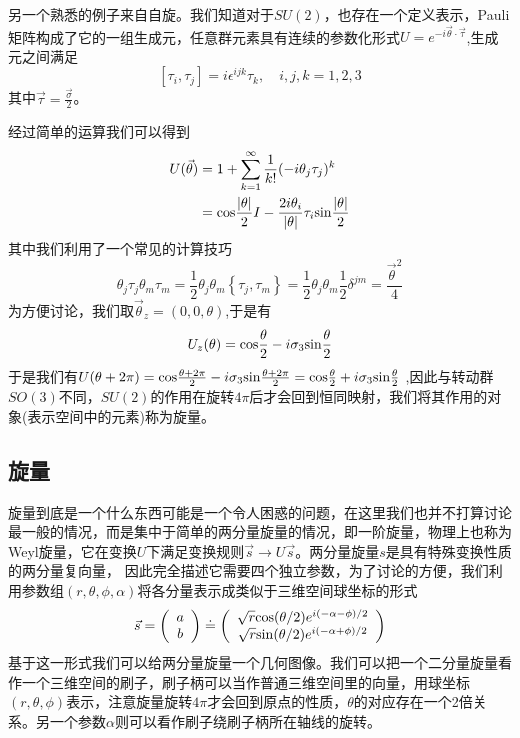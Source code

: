 另一个熟悉的例子来自自旋。我们知道对于$SU(2)$，也存在一个定义表示，Pauli矩阵构成了它的一组生成元，任意群元素具有连续的参数化形式$U=e^{-i\vec{\theta}\cdot\vec{\tau}}$,生成元之间满足
\begin{equation}
    \left[\tau_{i},\tau_{j}\right]=i\epsilon^{ijk}\tau_{k},\quad i,j,k=1,2,3
\end{equation}
其中$\vec{\tau}=\frac{\vec{\sigma}}{2}$。

经过简单的运算我们可以得到
\begin{equation}
\label{chap4U}
\begin{aligned}
    U(\vec{\theta})&=1+\sum\limits_{k=1}\limits^{\infty}\frac{1}{k!}(-i\theta_{j}\tau_{j})^{k}\\
    &={\rm cos}\frac{|\theta|}{2}I-\frac{2i\theta_{i}}{|\theta|}\tau_{i}{\rm sin}\frac{|\theta|}{2}
    \end{aligned}
\end{equation}
其中我们利用了一个常见的计算技巧
\begin{equation}
    \theta_{j}\tau_{j}\theta_{m}\tau_{m}=\frac{1}{2}\theta_{j}\theta_{m}\left\{\tau_{j},\tau_{m}\right\}=\frac{1}{2}\theta_{j}\theta_{m}\frac{1}{2}\delta^{jm}=\frac{\vec{\theta}^{2}}{4}
\end{equation}
为方便讨论，我们取$\vec{\theta}_{z}=(0,0,\theta)$,于是有
\begin{equation}
    U_{z}(\theta)={\rm cos}\frac{\theta}{2}-i\sigma_{3}{\rm sin}\frac{\theta}{2}
\end{equation}
于是我们有$U(\theta+2\pi)={\rm cos}\frac{\theta+2\pi}{2}-i\sigma_{3}{\rm sin}\frac{\theta+2\pi}{2}={\rm cos}\frac{\theta}{2}+i\sigma_{3}{\rm sin}\frac{\theta}{2}$
,因此与转动群$SO(3)$不同，$SU(2)$的作用在旋转$4\pi$后才会回到恒同映射，我们将其作用的对象(表示空间中的元素)称为旋量。
\subsection{旋量}
旋量到底是一个什么东西可能是一个令人困惑的问题，在这里我们也并不打算讨论最一般的情况，而是集中于简单的两分量旋量的情况，即一阶旋量，物理上也称为Weyl旋量，它在变换$U$下满足变换规则$\vec{s}\longrightarrow U\vec{s}$。两分量旋量$s$是具有特殊变换性质的两分量复向量，
因此完全描述它需要四个独立参数，为了讨论的方便，我们利用参数组$(r,\theta,\phi,\alpha)$将各分量表示成类似于三维空间球坐标的形式
\begin{equation}
\label{chap4define}
    \vec{s}=\left(\begin{array}{c}
         a  \\
          b
    \end{array}\right)\doteq
    \left(\begin{array}{c}
         \sqrt{r}{\rm cos}(\theta/2)e^{i(-\alpha-\phi)/2}  \\
          \sqrt{r}{\rm sin}(\theta/2)e^{i(-\alpha+\phi)/2} 
    \end{array}\right)
\end{equation}
基于这一形式我们可以给两分量旋量一个几何图像。我们可以把一个二分量旋量看作一个三维空间的刷子，刷子柄可以当作普通三维空间里的向量，用球坐标$(r,\theta,\phi)$表示，注意旋量旋转$4\pi$才会回到原点的性质，$\theta$的对应存在一个2倍关系。另一个参数$\alpha$则可以看作刷子绕刷子柄所在轴线的旋转。

